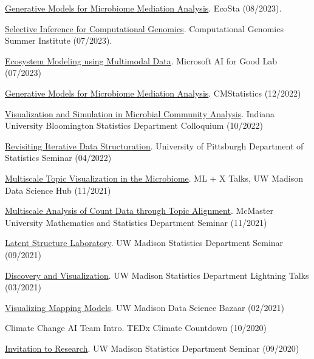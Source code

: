 \documentclass[letterpaper]{article}
\renewenvironment{itemize}{
  \begin{list}{}{
    \setlength{\leftmargin}{1.5em}
  }
}{
  \end{list}
}
\begin{document}
\begin{itemize}
  \item \href{https://go.wisc.edu/77q6rs}{Generative Models for Microbiome Mediation Analysis}. EcoSta (08/2023).
  \item \href{https://go.wisc.edu/7l1k95}{Selective Inference for Computational Genomics}. Computational Genomics Summer Institute (07/2023).
  \item \href{https://krisrs1128.github.io/talks/2023/20230705/20230705.html}{Ecosystem Modeling using Multimodal Data}. Microsoft AI for Good Lab (07/2023)
  \item \href{https://krisrs1128.github.io/talks/2022/20221217/20221217.html}{Generative Models for Microbiome Mediation Analysis}. CMStatistics (12/2022)
  \item \href{https://krisrs1128.github.io/talks/2022/20221021/20221021.html}{Visualization and Simulation in Microbial Community Analysis}. Indiana University Bloomington Statistics Department Colloquium (10/2022)
  \item \href{https://drive.google.com/file/d/1ju9f8e8aRb5OYLE28Ub0Pc6i2KCpcjgN/view?usp=sharing}{Revisiting Iterative Data Structuration}. University of Pittsburgh Department of Statistics Seminar (04/2022)
  \item \href{https://drive.google.com/file/d/14Lwhvd28sGEMSpw3AXZUsg8XXL25Gr4J/view?usp=sharing}{Multiscale Topic Visualization in the Microbiome}. ML + X Talks, UW Madison Data Science Hub (11/2021)
  \item \href{https://drive.google.com/file/d/1vcs_aLp6gZFixenGscrj6C5koEltxvGa/view?usp=sharing}{Multiscale Analysis of Count Data through Topic Alignment}. McMaster University Mathematics and Statistics Department Seminar (11/2021)
  \item \href{https://drive.google.com/file/d/1xwYyGc1bx7W-F5QyQlB3OJZT7MVTpdYd/view?usp=sharing}{Latent Structure Laboratory}. UW Madison Statistics Department Seminar (09/2021)
  \item \href{https://drive.google.com/drive/folders/16P8ZeKM1IEZFgCHgSxakUymamMZkNkTl}{Discovery and Visualization}. UW Madison Statistics Department Lightning Talks (03/2021)
  \item \href{https://krisrs1128.github.io/mapping-vis/}{Visualizing Mapping Models}. UW Madison Data Science Bazaar (02/2021)
  \item Climate Change AI Team Intro. TEDx Climate Countdown (10/2020)
  \item \href{https://drive.google.com/file/d/1xwYyGc1bx7W-F5QyQlB3OJZT7MVTpdYd/view?usp=sharing}{Invitation to Research}. UW Madison Statistics Department Seminar (09/2020)

\end{itemize}
\end{document}
